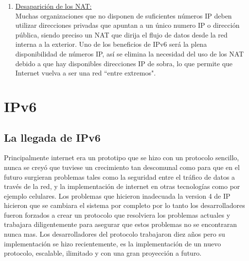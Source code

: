 \documentclass[11pt,a4paper]{article}
\begin{document}
\begin{enumerate}
\item  \underline{Desaparición de los NAT:}\\
Muchas organizaciones que no disponen de suficientes números IP deben utilizar direcciones privadas 
que apuntan a un único numero IP o dirección pública, siendo preciso un NAT que dirija el flujo de 
datos desde la red interna a la exterior. Uno de los beneficios de IPv6 será la plena disponibilidad 
de números IP, así se elimina la necesidad del uso de los NAT debido a que hay disponibles 
direcciones IP de sobra, lo que permite que Internet vuelva a ser una red ``entre extremos".
\end{enumerate}

\section{IPv6} 
\subsection{La llegada de IPv6}
Principalmente internet era un prototipo que se hizo con un protocolo sencillo, nunca se creyó que 
tuviese un crecimiento tan descomunal como para que en el futuro surgieran problemas tales como la 
seguridad entre el tráfico de datos a través de la red, y la implementación de internet en otras 
tecnologías como por ejemplo celulares. Los problemas que hicieron inadecuada la version 4 de IP 
hicieron que se cambiara el sistema por completo por lo tanto los desarrolladores fueron forzados a 
crear un protocolo que resolviera los problemas actuales y trabajara diligentemente para asegurar 
que estos problemas no se encontraran nunca mas. Los desarrolladores del protocolo trabajaron diez 
años pero su implementación se hizo recientemente, es la implementación de un nuevo protocolo, 
escalable, ilimitado y con una gran proyección a futuro.\par
\end{document}
